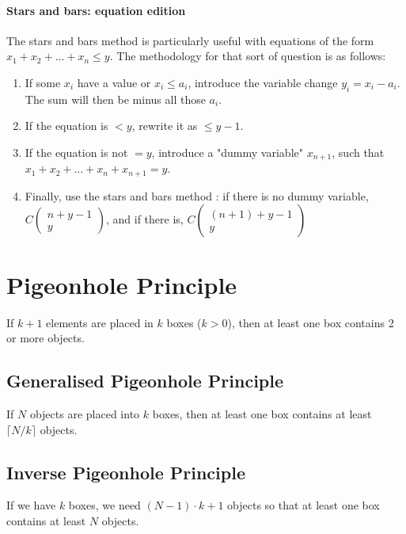 \documentclass[10pt,a4paper]{book}
\begin{document}
\paragraph*{Stars and bars: equation edition}
The stars and bars method is particularly useful with equations of the form $x_1+x_2+...+x_n\leq y$. The methodology for that sort of question is as follows:
\begin{enumerate}[nosep]
\item If some $x_i$ have a value or $x_i\leq a_i$, introduce the variable change $y_i = x_i-a_i$. The sum will then be minus all those $a_i$.
\item If the equation is $<y$, rewrite it as $\leq y-1$.
\item If the equation is not $=y$, introduce a "dummy variable" $x_{n+1}$, such that $x_1+x_2+...+x_n+x_{n+1}=y$.
\item Finally, use the stars and bars method : if there is no dummy variable, $C\begin{pmatrix}n+y-1\\y\end{pmatrix}$, and if there is, $C\begin{pmatrix}(n+1)+y-1\\y\end{pmatrix}$
\end{enumerate}
\section{Pigeonhole Principle}
If $k+1$ elements are placed in $k$ boxes ($k>0$), then at least one box contains 2 or more objects.
\subsection{Generalised Pigeonhole Principle}
If $N$ objects are placed into $k$ boxes, then at least one box contains at least $\lceil N/k\rceil$ objects.
\subsection{Inverse Pigeonhole Principle}
If we have $k$ boxes, we need $(N-1)\cdot k+1$ objects so that at least one box contains at least $N$ objects.

\end{document}
